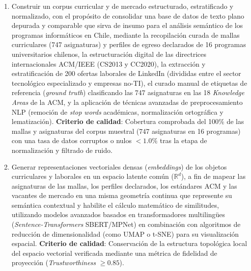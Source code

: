 \begin{enumerate}[label=\arabic*., nosep]
	\item Construir un corpus curricular y de mercado estructurado, estratificado y normalizado, con el propósito de consolidar una base de datos de texto plano depurada y comparable que sirva de insumo para el análisis semántico de los programas informáticos en Chile, mediante la recopilación curada de mallas curriculares (747 asignaturas) y perfiles de egreso declarados de 16 programas universitarios chilenos, la estructuración digital de las directrices internacionales ACM/IEEE (CS2013 y CC2020), la extracción y estratificación de 200 ofertas laborales de LinkedIn (divididas entre el sector tecnológico especializado y empresas no-TI), el curado manual de etiquetas de referencia (\textit{ground truth}) clasificando las 747 asignaturas en las 18 \textit{Knowledge Areas} de la ACM, y la aplicación de técnicas avanzadas de preprocesamiento NLP (remoción de \textit{stop words} académicas, normalización ortográfica y lematización). \textbf{Criterio de calidad}: Cobertura comprobada del 100\% de las mallas y asignaturas del corpus muestral (747 asignaturas en 16 programas) con una tasa de datos corruptos o nulos $< 1.0\%$ tras la etapa de normalización y filtrado de ruido.

	\item Generar representaciones vectoriales densas (\textit{embeddings}) de los objetos curriculares y laborales en un espacio latente común ($\mathbb{R}^d$), a fin de mapear las asignaturas de las mallas, los perfiles declarados, los estándares ACM y las vacantes de mercado en una misma geometría continua que represente su semántica contextual y habilite el cálculo matemático de similitudes, utilizando modelos avanzados basados en transformadores multilingües (\textit{Sentence-Transformers} SBERT/MPNet) en combinación con algoritmos de reducción de dimensionalidad (como UMAP o t-SNE) para su visualización espacial. \textbf{Criterio de calidad}: Conservación de la estructura topológica local del espacio vectorial verificada mediante una métrica de fidelidad de proyección (\textit{Trustworthiness} $\ge 0.85$).


\end{enumerate}
